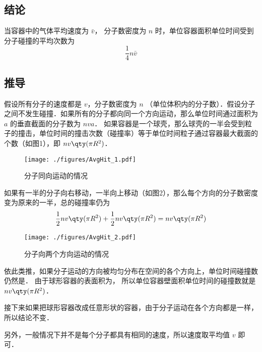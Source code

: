 
\subsection{结论}

当容器中的气体平均速度为 $\bar v$， 分子数密度为 $n$ 时，单位容器面积单位时间受到分子碰撞的平均次数为
\begin{equation}
\frac14 n\bar v
\end{equation}
\subsection{推导}

假设所有分子的速度都是 $v$，分子数密度为 $n$ （单位体积内的分子数）．假设分子之间不发生碰撞．如果所有的分子都向同一个方向运动，那么单位时间通过面积为 $a$ 的垂直截面的分子数为 $nva$． 如果容器是一个球壳，那么球壳的一半会受到粒子的撞击，单位时间的撞击次数（碰撞率）等于单位时间粒子通过容器最大截面的个数（如图1），即 $nv \qty(\pi R^2)$． 
\begin{figure}[ht]
\centering
\texttt{[image: ./figures/AvgHit\_1.pdf]}
\caption{分子同向运动的情况} \label{AvgHit_fig1}
\end{figure}
如果有一半的分子向右移动，一半向上移动（如图2），那么每个方向的分子数密度变为原来的一半，总的碰撞率仍为
\begin{equation}
\frac12 nv \qty(\pi R^2) + \frac12 nv \qty(\pi R^2) = nv \qty(\pi R^2)
\end{equation}

\begin{figure}[ht]
\centering
\texttt{[image: ./figures/AvgHit\_2.pdf]}
\caption{分子向两个方向运动的情况} \label{AvgHit_fig2}
\end{figure}
依此类推，如果分子运动的方向被均匀分布在空间的各个方向上，单位时间碰撞数仍然是．
由于球形容器的表面积为， 所以单位容器壁面积单位时间的碰撞数就是 $nv \qty(\pi R^2)$． 

接下来如果把球形容器改成任意形状的容器，由于分子运动在各个方向都是一样，所以结论不变．

另外，一般情况下并不是每个分子都具有相同的速度，所以速度取平均值 $v$ 即可．

